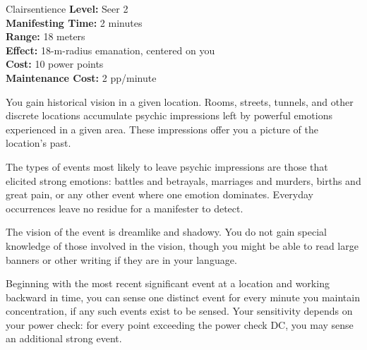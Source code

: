 {Clairsentience}
{
	\textbf{Level:}
	Seer 2\\
	\textbf{Manifesting Time:}
	2 minutes\\
	\textbf{Range:}
	18 meters\\
	\textbf{Effect:}
	18-m-radius emanation, centered on you\\
	\textbf{Cost:}
	10 power points\\
	\textbf{Maintenance Cost:}
	2 pp/minute\\
}
{
	You gain historical vision in a given location. Rooms, streets, tunnels, and other discrete locations accumulate psychic impressions left by powerful emotions experienced in a given area. These impressions offer you a picture of the location's past.

	The types of events most likely to leave psychic impressions are those that elicited strong emotions: battles and betrayals, marriages and murders, births and great pain, or any other event where one emotion dominates. Everyday occurrences leave no residue for a manifester to detect.

	The vision of the event is dreamlike and shadowy. You do not gain special knowledge of those involved in the vision, though you might be able to read large banners or other writing if they are in your language.

	Beginning with the most recent significant event at a location and working backward in time, you can sense one distinct event for every minute you maintain concentration, if any such events exist to be sensed. Your sensitivity depends on your power check: for every point exceeding the power check DC, you may sense an additional strong event.
}